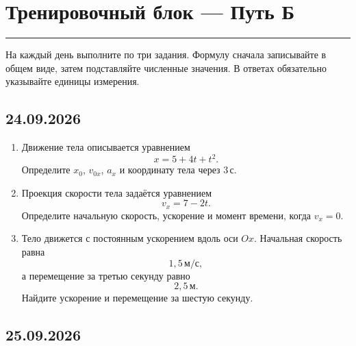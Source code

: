 \documentclass[a4paper,12pt]{article}
\newcommand{\sectionline}{%
  \vspace{0.1em}
  \noindent\textcolor{accent}{\rule{\linewidth}{0.5pt}}
  \vspace{0.45em}
}
\newcommand{\ms}{\,\text{м/с}}
\newcommand{\metre}{\,\text{м}}
\newcommand{\second}{\,\text{с}}
\begin{document}
\clearpage


\section*{Тренировочный блок --- Путь Б}
\sectionline

На каждый день выполните по три задания. Формулу сначала записывайте в общем виде, затем подставляйте численные значения. В ответах обязательно указывайте единицы измерения.

\subsection*{24.09.2026}

\begin{enumerate}[label=\textbf{\arabic*.}]

  \item
  Движение тела описывается уравнением
  \[
    x=5+4t+t^2.
  \]
  Определите $x_0$, $v_{0x}$, $a_x$ и координату тела через $3\second$.

  \item
  Проекция скорости тела задаётся уравнением
  \[
    v_x=7-2t.
  \]
  Определите начальную скорость, ускорение и момент времени, когда $v_x=0$.

  \item
  Тело движется с постоянным ускорением вдоль оси $Ox$. Начальная скорость равна
  \[
    1{,}5\ms,
  \]
  а перемещение за третью секунду равно
  \[
    2{,}5\metre.
  \]
  Найдите ускорение и перемещение за шестую секунду.

\end{enumerate}

\clearpage

\subsection*{25.09.2026}
\end{document}
